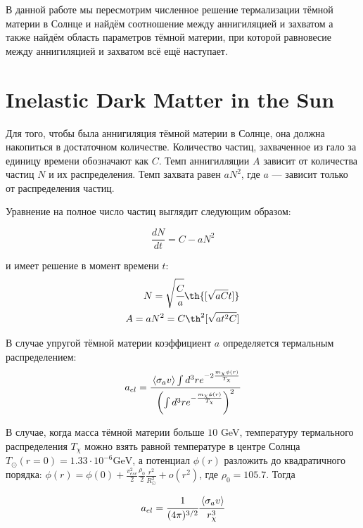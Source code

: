 \documentclass[a4paper, 14pt]{article}
\newcommand{\tderiv}[1]{\frac{d #1}{d t}}
\newcommand{\avarage}[1]{\left\langle #1 \right\rangle}
\begin{document}
В данной работе мы пересмотрим численное решение термализации тёмной материи в Солнце и найдём соотношение между аннигиляцией и захватом а также найдём область параметров тёмной материи, при которой равновесие между аннигиляцией и захватом всё ещё наступает.
	
	\section{Inelastic Dark Matter in the Sun}
	Для того, чтобы была аннигиляция тёмной материи в Солнце, она должна накопиться в достаточном количестве. Количество частиц, захваченное из гало за единицу времени обозначают как $C$. Темп аннигилляции $A$ зависит от количества частиц $N$ и их распределения. Темп захвата равен $aN^2$, где $a$ --- зависит только от распределения частиц. 

Уравнение на полное число частиц выглядит следующим образом:

\begin{equation}
	\label{eq:Balance}
	\tderiv{N} = C - aN^2
\end{equation}

\noindent и имеет решение в момент времени $t$:
\begin{equation}
\begin{split}
	N = \sqrt{\cfrac{C}{a}} \th{[\sqrt{aC}t]} \\
	A = aN^2 = C \th^2{[\sqrt{at^2C}]}
	\label{eq:AnnNtherm}
\end{split}
\end{equation}
	

В случае упругой тёмной материи коэффициент $a$ определяется термальным распределением:
\begin{equation}
	a_{el} = \cfrac{
		\avarage{\sigma_{a}v} \int{d^3 r e^{-2 \frac{m_{\chi}\phi(r)}{T_{\chi}} }}
	}{\left(
		\int{d^3 r e^{- \frac{m_{\chi}\phi(r)}{T_{\chi}} }}
	\right)^2}
\end{equation}

В случае, когда масса тёмной материи больше $10$ GeV, температуру термального распределения $T_{\chi}$ можно взять равной температуре в центре Солнца $T_{\odot}(r=0) = 1.33\cdot10^{-6} \text{GeV}$, а потенциал $\phi(r)$ разложить до квадратичного порядка: $\phi(r) =\phi(0)+ \frac{v_{esc}^2}{2} \frac{\rho_0}{2} \frac{r^2}{R_{\odot}^2} + o(r^2)$,  где $\rho_0 = 105.7$. Тогда

\begin{equation}
	a_{el} = \cfrac{1}{(4\pi)^{3/2}} \cfrac{\avarage{\sigma_{a}v}}{ r_{\chi}^3 }
\end{equation}
\end{document}
